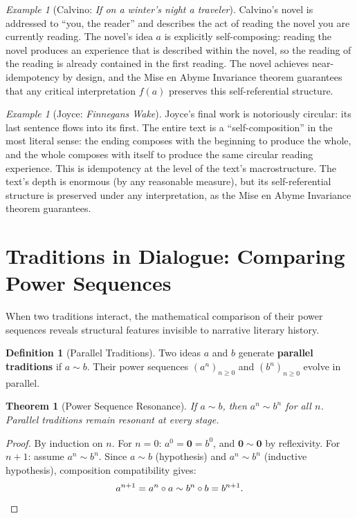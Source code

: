 \documentclass[11pt,openany]{book}
\theoremstyle{definition}
\newtheorem{definition}[axiom]{Definition}
\theoremstyle{plain}
\newtheorem{theorem}[axiom]{Theorem}
\theoremstyle{remark}
\newtheorem{example}[axiom]{Example}
\newcommand{\compose}{\circ}                 %
\newcommand{\void}{\mathbf{0}}              %
\newcommand{\res}{\sim}                      %
\begin{document}
\begin{example}[Calvino: \textit{If on a winter's night a traveler}]
Calvino's novel is addressed to ``you, the reader'' and describes the act of reading the novel you are currently reading. The novel's idea $a$ is explicitly self-composing: reading the novel produces an experience that is described within the novel, so the reading of the reading is already contained in the first reading. The novel achieves near-idempotency by design, and the Mise en Abyme Invariance theorem guarantees that any critical interpretation $f(a)$ preserves this self-referential structure.
\end{example}

\begin{example}[Joyce: \textit{Finnegans Wake}]
Joyce's final work is notoriously circular: its last sentence flows into its first. The entire text is a ``self-composition'' in the most literal sense: the ending composes with the beginning to produce the whole, and the whole composes with itself to produce the same circular reading experience. This is idempotency at the level of the text's macrostructure. The text's depth is enormous (by any reasonable measure), but its self-referential structure is preserved under any interpretation, as the Mise en Abyme Invariance theorem guarantees.
\end{example}

\section{Traditions in Dialogue: Comparing Power Sequences}

When two traditions interact, the mathematical comparison of their power sequences reveals structural features invisible to narrative literary history.

\begin{definition}[Parallel Traditions]
Two ideas $a$ and $b$ generate \textbf{parallel traditions} if $a \res b$. Their power sequences $(a^n)_{n \geq 0}$ and $(b^n)_{n \geq 0}$ evolve in parallel.
\end{definition}

\begin{theorem}[Power Sequence Resonance]
If $a \res b$, then $a^n \res b^n$ for all $n$. Parallel traditions remain resonant at every stage.
\end{theorem}

\begin{proof}
By induction on $n$. For $n = 0$: $a^0 = \void = b^0$, and $\void \res \void$ by reflexivity. For $n + 1$: assume $a^n \res b^n$. Since $a \res b$ (hypothesis) and $a^n \res b^n$ (inductive hypothesis), composition compatibility gives:
\[
a^{n+1} = a^n \compose a \res b^n \compose b = b^{n+1}. \qedhere
\]
\end{proof}
\end{document}
